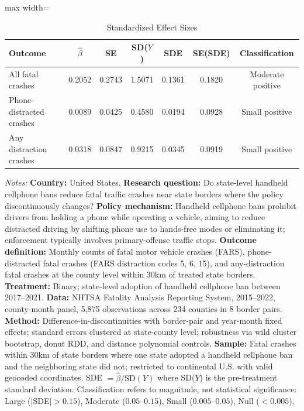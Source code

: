 \begin{table}[htbp]
\centering
\caption{Standardized Effect Sizes}
\label{tab:sde}
\begin{adjustbox}{max width=\textwidth}
\begin{tabular}{lcccccc}
\hline\hline
Outcome & $\hat{\beta}$ & SE & SD($Y$) & SDE & SE(SDE) & Classification \\
\hline
All fatal crashes & 0.2052 & 0.2743 & 1.5071 & 0.1361 & 0.1820 & Moderate positive \\
Phone-distracted crashes & 0.0089 & 0.0425 & 0.4580 & 0.0194 & 0.0928 & Small positive \\
Any distraction crashes & 0.0318 & 0.0847 & 0.9215 & 0.0345 & 0.0919 & Small positive \\
\hline\hline
\end{tabular}
\end{adjustbox}
\begin{tablenotes}
\item \textit{Notes:} \textbf{Country:} United States. \textbf{Research question:} Do state-level handheld cellphone bans reduce fatal traffic crashes near state borders where the policy discontinuously changes? \textbf{Policy mechanism:} Handheld cellphone bans prohibit drivers from holding a phone while operating a vehicle, aiming to reduce distracted driving by shifting phone use to hands-free modes or eliminating it; enforcement typically involves primary-offense traffic stops. \textbf{Outcome definition:} Monthly counts of fatal motor vehicle crashes (FARS), phone-distracted fatal crashes (FARS distraction codes 5, 6, 15), and any-distraction fatal crashes at the county level within 30km of treated state borders. \textbf{Treatment:} Binary; state-level adoption of handheld cellphone ban between 2017--2021. \textbf{Data:} NHTSA Fatality Analysis Reporting System, 2015--2022, county-month panel, 5,875 observations across 234 counties in 8 border pairs. \textbf{Method:} Difference-in-discontinuities with border-pair and year-month fixed effects; standard errors clustered at state-county level; robustness via wild cluster bootstrap, donut RDD, and distance polynomial controls. \textbf{Sample:} Fatal crashes within 30km of state borders where one state adopted a handheld cellphone ban and the neighboring state did not; restricted to continental U.S. with valid geocoded coordinates. SDE $= \hat{\beta} / \text{SD}(Y)$ where SD($Y$) is the pre-treatment standard deviation. Classification refers to magnitude, not statistical significance: Large ($|$SDE$| > 0.15$), Moderate ($0.05$--$0.15$), Small ($0.005$--$0.05$), Null ($< 0.005$).
\end{tablenotes}
\end{table}

